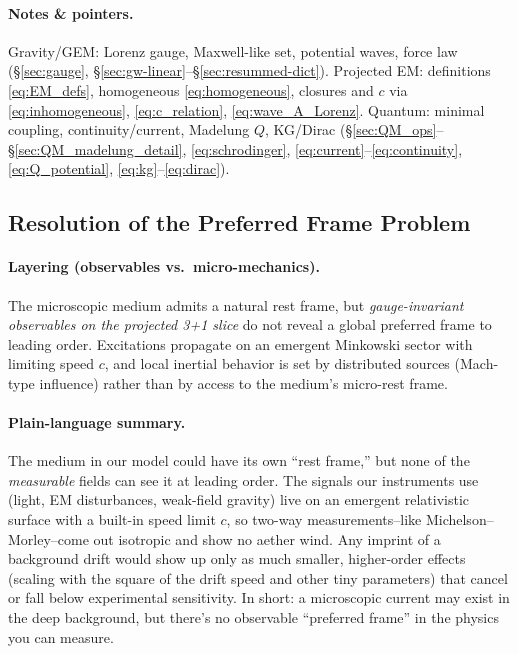 \paragraph*{Notes \& pointers.}
Gravity/GEM: Lorenz gauge, Maxwell-like set, potential waves, force law (\S\ref{sec:gauge}, \S\ref{sec:gw-linear}–\S\ref{sec:resummed-dict}).\;
Projected EM: definitions \eqref{eq:EM_defs}, homogeneous \eqref{eq:homogeneous}, closures and $c$ via \eqref{eq:inhomogeneous}, \eqref{eq:c_relation}, \eqref{eq:wave_A_Lorenz}.\;
Quantum: minimal coupling, continuity/current, Madelung \(Q\), KG/Dirac (\S\ref{sec:QM_ops}–\S\ref{sec:QM_madelung_detail}, \eqref{eq:schrodinger}, \eqref{eq:current}–\eqref{eq:continuity}, \eqref{eq:Q_potential}, \eqref{eq:kg}–\eqref{eq:dirac}).



\subsection{Resolution of the Preferred Frame Problem}
\label{subsec:preferred-frame}

\paragraph*{Layering (observables vs.\ micro-mechanics).}
The microscopic medium admits a natural rest frame, but \emph{gauge-invariant observables on the projected 3+1 slice} do not reveal a global preferred frame to leading order. Excitations propagate on an emergent Minkowski sector with limiting speed $c$, and local inertial behavior is set by distributed sources (Mach-type influence) rather than by access to the medium's micro-rest frame.

\paragraph*{Plain-language summary.} The medium in our model could have its own ``rest frame,'' but none of the \emph{measurable} fields can see it at leading order. The signals our instruments use (light, EM disturbances, weak-field gravity) live on an emergent relativistic surface with a built-in speed limit $c$, so two-way measurements--like Michelson–Morley--come out isotropic and show no aether wind. Any imprint of a background drift would show up only as much smaller, higher-order effects (scaling with the square of the drift speed and other tiny parameters) that cancel or fall below experimental sensitivity. In short: a microscopic current may exist in the deep background, but there's no observable ``preferred frame'' in the physics you can measure.

